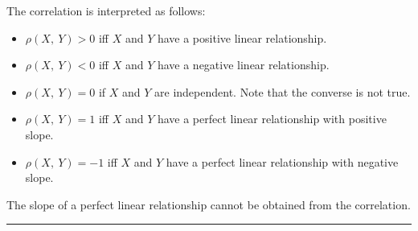 \documentclass{article}
\begin{document}
\begin{multicols}{3}
    The correlation is interpreted as follows:
    \begin{itemize}
        \item \(\rho\left( X,\: Y \right) > 0\) iff \(X\) and \(Y\) have a positive linear relationship.
        \item \(\rho\left( X,\: Y \right) < 0\) iff \(X\) and \(Y\) have a negative linear relationship.
        \item \(\rho\left( X,\: Y \right) = 0\) if \(X\) and \(Y\) are independent. Note that the converse is not true.
        \item \(\rho\left( X,\: Y \right) = 1\) iff \(X\) and \(Y\) have a perfect linear relationship with positive slope.
        \item \(\rho\left( X,\: Y \right) = -1\) iff \(X\) and \(Y\) have a perfect linear relationship with negative slope.
    \end{itemize}
    The slope of a perfect linear relationship cannot be obtained from the correlation.
\end{multicols}
\hrule
\end{document}
